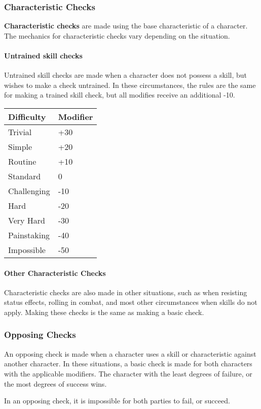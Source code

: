 \documentclass[]{article}
\let\oldparagraph\paragraph
\renewcommand{\paragraph}[1]{\oldparagraph{#1}\mbox{}}
\begin{document}
\subsubsection{Characteristic Checks}\label{characteristic-checks}

\textbf{Characteristic checks} are made using the base characteristic of
a character. The mechanics for characteristic checks vary depending on
the situation.

\paragraph{Untrained skill checks}\label{untrained-skill-checks}

Untrained skill checks are made when a character does not possess a
skill, but wishes to make a check untrained. In these circumstances, the
rules are the same for making a trained skill check, but all modifies
receive an additional -10.

\begin{longtable}[]{@{}ll@{}}
\toprule
Difficulty & Modifier\tabularnewline
\midrule
\endhead
Trivial & +30\tabularnewline
Simple & +20\tabularnewline
Routine & +10\tabularnewline
Standard & 0\tabularnewline
Challenging & -10\tabularnewline
Hard & -20\tabularnewline
Very Hard & -30\tabularnewline
Painstaking & -40\tabularnewline
Impossible & -50\tabularnewline
\bottomrule
\end{longtable}

\paragraph{Other Characteristic
Checks}\label{other-characteristic-checks}

Characteristic checks are also made in other situations, such as when
resisting status effects, rolling in combat, and most other
circumstances when skills do not apply. Making these checks is the same
as making a basic check.

\subsubsection{Opposing Checks}\label{opposing-checks}

An opposing check is made when a character uses a skill or
characteristic against another character. In these situations, a basic
check is made for both characters with the applicable modifiers. The
character with the least degrees of failure, or the most degrees of
success wins.

In an opposing check, it is impossible for both parties to fail, or
succeed.
\end{document}
